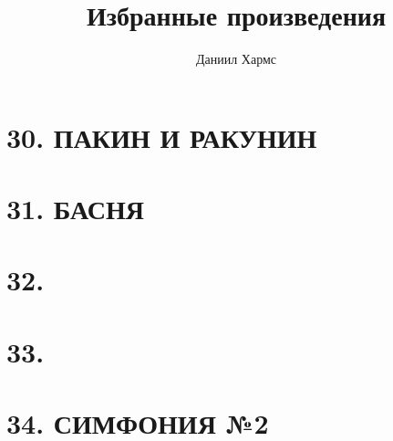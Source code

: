 \documentclass{book}
\begin{document}
\title{Избранные произведения}
\author{Даниил Хармс}
\date{}
\maketitle

\chapter*{30. ПАКИН И РАКУНИН}

\chapter*{31. БАСНЯ}

\chapter*{32.}

\chapter*{33.}

\chapter*{34. СИМФОНИЯ №2}

\end{document}
